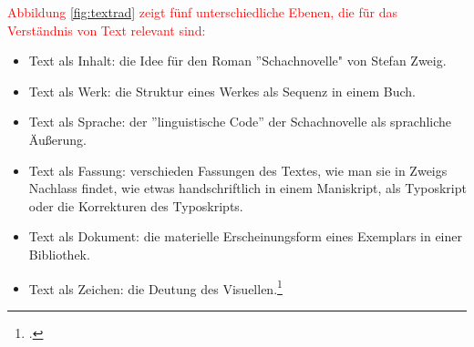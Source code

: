 \documentclass[12pt,a4paper]{article}
\begin{document}
\textcolor{red}{Abbildung \ref{fig:textrad} zeigt fünf unterschiedliche Ebenen, die für das Verständnis von Text relevant sind:}
\begin{itemize}
    \item Text als Inhalt: die Idee für den Roman ''Schachnovelle" von Stefan Zweig.
    \item Text als Werk: die Struktur eines Werkes als Sequenz in einem Buch.
    \item Text als Sprache: der ''linguistische Code'' der Schachnovelle als sprachliche Äußerung.
    \item Text als Fassung: verschieden Fassungen des Textes, wie man sie in Zweigs Nachlass findet, wie etwas handschriftlich in einem Maniskript, als Typoskript oder die Korrekturen des Typoskripts. 
    \item Text als Dokument: die materielle Erscheinungsform eines Exemplars in einer Bibliothek.
    \item Text als Zeichen: die Deutung des Visuellen.\footcite[][S.46]{sahle2013digitale}
\end{itemize}
\end{document}
